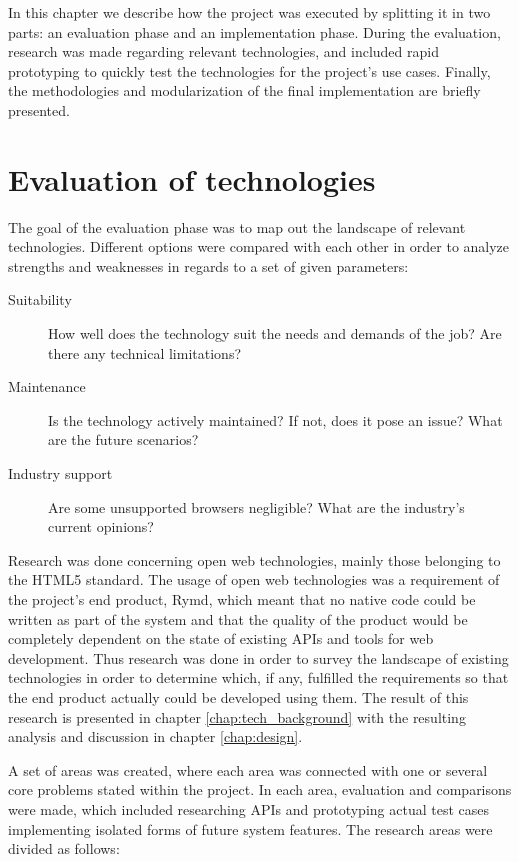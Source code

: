 In this chapter we describe how the project was executed by splitting it in two parts: an evaluation phase and an implementation phase. During the evaluation, research was made regarding relevant technologies, and included rapid prototyping to quickly test the technologies for the project's use cases. Finally, the methodologies and modularization of the final implementation are briefly presented.

\section{Evaluation of technologies}

The goal of the evaluation phase was to map out the landscape of relevant technologies. Different options were compared with each other in order to analyze strengths and weaknesses in regards to a set of given parameters:

\begin{description}
  \item[Suitability] How well does the technology suit the needs and demands of the job? Are there any technical limitations?
  \item[Maintenance] Is the technology actively maintained? If not, does it pose an issue? What are the future scenarios?
  \item[Industry support] Are some unsupported browsers negligible? What are the industry's current opinions?
\end{description}

Research was done concerning open web technologies, mainly those belonging to the HTML5 standard. The usage of open web technologies was a requirement of the project's end product, Rymd, which meant that no native code could be written as part of the system and that the quality of the product would be completely dependent on the state of existing APIs and tools for web development. Thus research was done in order to survey the landscape of existing technologies in order to determine which, if any, fulfilled the requirements so that the end product actually could be developed using them. The result of this research is presented in chapter \ref{chap:tech_background} with the resulting analysis and discussion in chapter \ref{chap:design}.

A set of areas was created, where each area was connected with one or several core problems stated within the project. In each area, evaluation and comparisons were made, which included researching APIs and prototyping actual test cases implementing isolated forms of future system features. The research areas were divided as follows:

